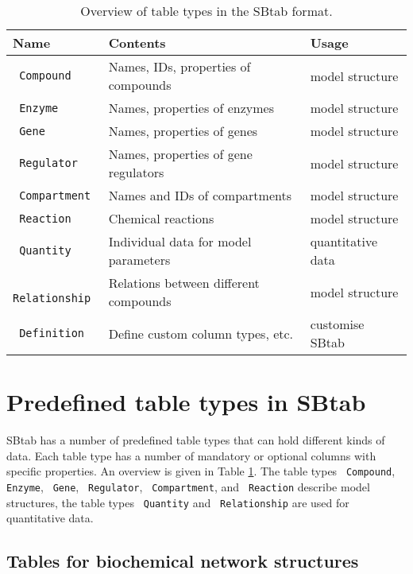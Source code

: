 \documentclass[a4paper]{article}
\newcommand{\la}[1]{}
\newcommand{\tab}[1]{{\texttt{\color{red} #1}}}
\begin{document}
 \begin{table}[h!]
   \begin{center}
     \begin{tabular}{|l|l|l|}
       \hline
       Name & Contents & Usage  \\
       \hline
       \tab{Compound}   & Names, IDs, properties of compounds & model structure \\
       \tab{Enzyme}     & Names, properties of enzymes        & model structure \\
       \tab{Gene}       & Names, properties of genes          & model structure \\
       \tab{Regulator} & Names, properties of gene regulators & model structure \\
       \tab{Compartment} & Names and IDs of compartments      & model structure \\
       \tab{Reaction} &   Chemical reactions                  & model structure	\\
       \tab{Quantity} & Individual data for model parameters & quantitative data \\
       \tab{Relationship} & Relations between different compounds & model structure\\
	   \tab{Definition}   & Define custom column types, etc. & customise SBtab \\
       \hline
     \end{tabular}
   \end{center}
   \caption{Overview of table types in the SBtab format. \label{tab:tabletypes}}
 \end{table}


\section{Predefined table types in SBtab}
\label{chapter3}
SBtab has a number of predefined table types that can hold different
kinds of data. Each table type has a number of mandatory or optional
columns with specific properties. An overview is given in Table
\ref{tab:tabletypes}.  The table types \tab{Compound}, \tab{Enzyme},
\tab{Gene}, \tab{Regulator}, \tab{Compartment}, and \tab{Reaction}
describe model structures, the table types \tab{Quantity} and
\tab{Relationship} \la{, \tab{OmicsDataRow}, and \tab{OmicsDataColumn}} are
used for quantitative data.


\subsection{Tables for biochemical network structures}
\end{document}
